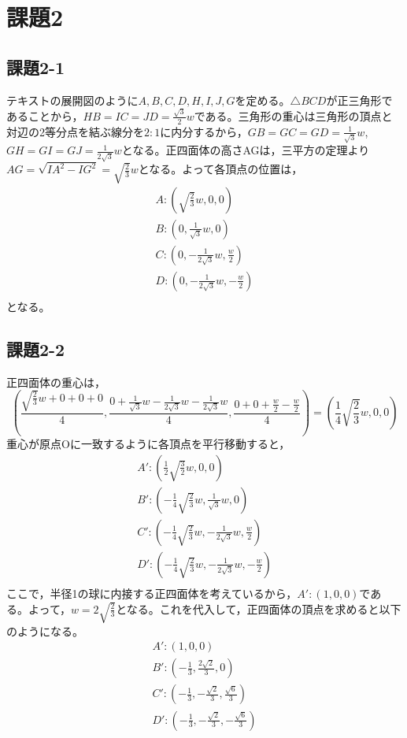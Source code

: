 \documentclass[]{jsarticle}
\begin{document}
\section{課題2}
\subsection{課題2-1}
テキストの展開図のように$A,B,C,D,H,I,J,G$を定める。$\triangle BCD$が正三角形であることから，$HB=IC=JD=\frac{\sqrt{3}}{2}w$である。三角形の重心は三角形の頂点と対辺の2等分点を結ぶ線分を$2:1$に内分するから，$GB=GC=GD=\frac{1}{\sqrt{3}}w$,$GH=GI=GJ=\frac{1}{2\sqrt{3}}w$となる。正四面体の高さAGは，三平方の定理より$AG=\sqrt{IA^2-IG^2}=\sqrt{\frac{2}{3}}w$となる。よって各頂点の位置は，
\begin{eqnarray*}
A:(\sqrt{\frac{2}{3}}w,0,0)\\
B:(0,\frac{1}{\sqrt{3}}w,0)\\
C:(0,-\frac{1}{2\sqrt{3}}w,\frac{w}{2})\\
D:(0,-\frac{1}{2\sqrt{3}}w,-\frac{w}{2})\\
\end{eqnarray*}
となる。

\subsection{課題2-2}
正四面体の重心は，
$$
\left( \frac{\sqrt{\frac{2}{3}}w+0+0+0}{4},\frac{0+\frac{1}{\sqrt{3}}w-\frac{1}{2\sqrt{3}}w-\frac{1}{2\sqrt{3}}w}{4},\frac{0+0+\frac{w}{2}-\frac{w}{2}}{4}\right)=\left(\frac{1}{4}\sqrt{\frac{2}{3}}w,0,0\right)
$$
重心が原点Oに一致するように各頂点を平行移動すると，
\begin{eqnarray*}
A':(\frac{1}{2}\sqrt{\frac{3}{2}}w,0,0)\\
B':(-\frac{1}{4}\sqrt{\frac{2}{3}}w,\frac{1}{\sqrt{3}}w,0)\\
C':(-\frac{1}{4}\sqrt{\frac{2}{3}}w,-\frac{1}{2\sqrt{3}}w,\frac{w}{2})\\
D':(-\frac{1}{4}\sqrt{\frac{2}{3}}w,-\frac{1}{2\sqrt{3}}w,-\frac{w}{2})\\
\end{eqnarray*}
ここで，半径1の球に内接する正四面体を考えているから，$A':(1,0,0)$である。よって，$w=2\sqrt{\frac{2}{3}}$となる。これを代入して，正四面体の頂点を求めると以下のようになる。
\begin{eqnarray*}
A':(1,0,0)\\
B':(-\frac{1}{3},\frac{2\sqrt{2}}{3},0)\\
C':(-\frac{1}{3},-\frac{\sqrt{2}}{3},\frac{\sqrt{6}}{3})\\
D':(-\frac{1}{3},-\frac{\sqrt{2}}{3},-\frac{\sqrt{6}}{3})
\end{eqnarray*}
\end{document}
